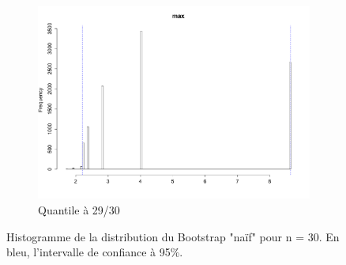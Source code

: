 \documentclass{article}
\renewcommand*{\(}{ \left( }
\renewcommand*{\)}{ \right) }
\begin{document}
\begin{figure}[H]
\begin{subfigure}[t]{0.3\textwidth}
        \includegraphics[width = \linewidth]{img/BootstrapNaif-Max-30.pdf}
        \caption{Quantile à 29/30}
        \label{fig:naifBMax}
    \end{subfigure}%
    \caption{Histogramme de la distribution du Bootstrap "naïf" pour n = 30. En bleu, l'intervalle de confiance à 95\%.}
    \label{fig:naifB}
\end{figure}
\end{document}
